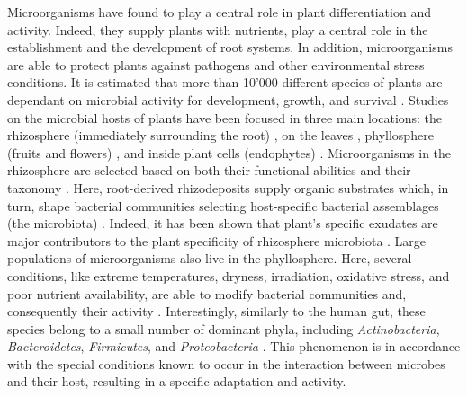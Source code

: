 Microorganisms have found to play a central role in plant differentiation and activity. Indeed, they supply plants with nutrients, play a central role in the establishment and the development of root systems. In addition, microorganisms are able to protect plants against pathogens and other environmental stress conditions. It is estimated that more than 10'000 different species of plants are dependant on microbial activity for development, growth, and survival \cite{van2008unseen}. Studies on the microbial hosts of plants have been focused in three main locations: the rhizosphere (immediately surrounding the root) \cite{borruso2014rhizosphere}, on the leaves \cite{rastogi2012leaf}, phyllosphere (fruits and flowers) \citep{aleklett2014microbial}, and inside plant cells (endophytes) \cite{bulgarelli2013structure}. Microorganisms in the rhizosphere are selected based on both their functional abilities and their taxonomy \cite{singh2004unravelling}. Here, root-derived rhizodeposits supply organic substrates which, in turn, shape bacterial communities selecting host-specific bacterial assemblages (the microbiota) \cite{bulgarelli2013structure}. Indeed, it has been shown that plant’s specific exudates are major contributors to the plant specificity of rhizosphere microbiota \cite{berg2009plant}. Large populations of microorganisms also live in the phyllosphere. Here, several conditions, like extreme temperatures, dryness, irradiation, oxidative stress, and poor nutrient availability, are able to modify bacterial communities and, consequently their activity \cite{lindow2003microbiology}. Interestingly, similarly to the human gut, these species belong to a small number of dominant phyla, including \textit{Actinobacteria}, \textit{Bacteroidetes}, \textit{Firmicutes}, and \textit{Proteobacteria} \cite{redford2010ecology}. This phenomenon is in accordance with the special conditions known to occur in the interaction between microbes and their host, resulting in a specific adaptation and activity.\\
